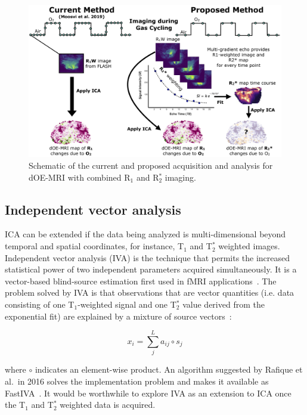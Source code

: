 \begin{figure}[htbp]
   \centering
   \includegraphics[width=\textwidth]{futurework/futurework-images/grantfig4_MGE_schematic.png} %
   \caption{Schematic of the current and proposed acquisition and analysis for \acs{dOE-MRI} with combined R$_1$ and R$_2^*$ imaging.
   \label{MGE_schematic}}
\end{figure}

\subsection{Independent vector analysis}

\acs{ICA} can be extended if the data being analyzed is multi-dimensional beyond temporal and spatial coordinates, for instance, T$_1$ and T$_2^*$ weighted images.
Independent vector analysis (\acs{IVA}) is the technique that permits the increased statistical power of two independent parameters acquired simultaneously.
It is a vector-based blind-source estimation first used in \acs{fMRI} applications~\cite{Lee:2008dc}. 
The problem solved by \acs{IVA} is that observations that are vector quantities (i.e. data consisting of one T$_1$-weighted signal and one T$_2^*$ value derived from the exponential fit) are explained by a mixture of source vectors~\cite{Lee:2008dc}:

\begin{equation}
x_i = \sum_{j}^{L} a_{ij} \circ s_j
\end{equation}

where $\circ$ indicates an element-wise product. 
An algorithm suggested by Rafique et al.\ in 2016 solves the implementation problem and makes it available as FastIVA~\cite{Rafique:2016cf}.
It would be worthwhile to explore \acs{IVA} as an extension to \acs{ICA} once the T$_1$ and T$_2^*$ weighted data is acquired.

